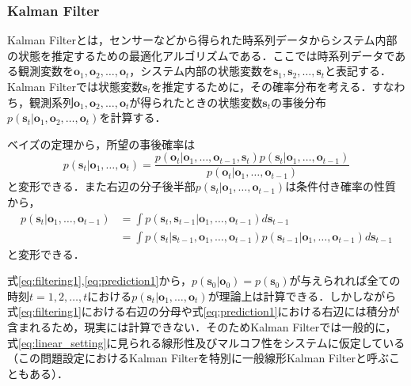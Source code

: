         \subsubsection{Kalman Filter}
        Kalman Filterとは，センサーなどから得られた時系列データからシステム内部の状態を推定するための最適化アルゴリズムである．ここでは時系列データである観測変数を$\bm{o}_1, \bm{o}_2, \dots, \bm{o}_t$，システム内部の状態変数を$\bm{s}_1, \bm{s}_2, \dots, \bm{s}_t$と表記する．Kalman Filterでは状態変数$\bm{s}_t$を推定するために，その確率分布を考える．すなわち，観測系列$\bm{o}_1, \bm{o}_2, \dots, \bm{o}_t$が得られたときの状態変数$\bm{s}_t$の事後分布$p(\bm{s}_t \left| \bm{o}_1, \bm{o}_2, \dots, \bm{o}_t \right.)$を計算する．
        \par
        ベイズの定理から，所望の事後確率は
        \begin{equation}
            \label{eq:filtering1}
            p(\left. \bm{s}_t \right| \bm{o}_1,\dots, \bm{o}_t ) = \frac{p(\left. \bm{o}_t \right| \bm{o}_1,\dots, \bm{o}_{t-1}, \bm{s}_t) p(\left.\bm{s}_t\right| \bm{o}_1,\dots, \bm{o}_{t-1})}{p(\left.\bm{o}_t\right| \bm{o}_1,\dots, \bm{o}_{t-1})}
        \end{equation}
        と変形できる．また右辺の分子後半部$p(\left.\bm{s}_t\right| \bm{o}_1,\dots, \bm{o}_{t-1})$は条件付き確率の性質から，
        \begin{equation}
            \label{eq:prediction1}
            \begin{aligned}
                p(\left.\bm{s}_t\right| \bm{o}_1,\dots, \bm{o}_{t-1}) &= \int p(\left.\bm{s}_t, \bm{s}_{t-1}\right| \bm{o}_1,\dots, \bm{o}_{t-1}) d\bm{s}_{t-1}
                \\ &= \int p(\left.\bm{s}_t\right|\bm{s}_{t-1}, \bm{o}_1,\dots, \bm{o}_{t-1}) p(\left.\bm{s}_{t-1}\right| \bm{o}_1,\dots, \bm{o}_{t-1}) d\bm{s}_{t-1}
            \end{aligned}        
        \end{equation}
        と変形できる．
        \par
        式\ref{eq:filtering1},\ref{eq:prediction1}から，$p(\bm{s}_0\left|\bm{o}_0\right.) = p(\bm{s}_0)$が与えられれば全ての時刻$t=1,2,\dots,t$における$p(\bm{s}_t\left|\bm{o}_1,\dots,\bm{o}_t\right.)$が理論上は計算できる．しかしながら式\ref{eq:filtering1}における右辺の分母や式\ref{eq:prediction1}における右辺には積分が含まれるため，現実には計算できない．そのためKalman Filterでは一般的に，式\ref{eq:linear_setting}に見られる線形性及びマルコフ性をシステムに仮定している（この問題設定におけるKalman Filterを特別に一般線形Kalman Filterと呼ぶこともある）．
